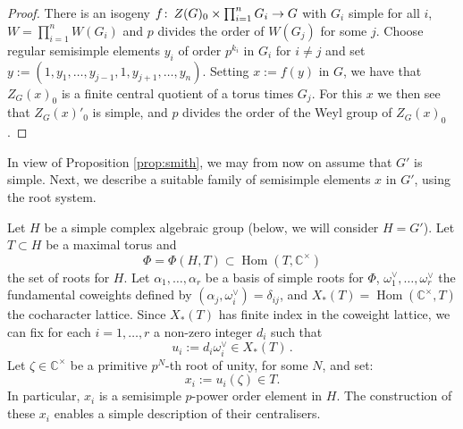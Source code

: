 \documentclass[oneside, 12pt, a4paper]{amsart}
\numberwithin{equation}{section}
\newcommand{\C}{\mathbb{C}}
\newcommand{\Hom}{\operatorname{Hom}}
\newcommand{\co}{\colon\thinspace}
\theoremstyle{plain}
\theoremstyle{definition}
\theoremstyle{remark}
\begin{document}
\begin{proof}
There is an isogeny $f\co Z(G)_0\times \prod_{i=1}^n G_i\to G$ with $G_i$ simple for all $i$, $W=\prod_{i=1}^n W(G_i)$ and $p$ divides the order of $W(G_j)$ for some $j$. Choose regular semisimple elements $y_i$ of order $p^{k_i}$ in $G_i$ for $i\neq j$ and set $y:=(1,y_1,\dots,y_{j-1},1,y_{j+1},\dots,y_n)$. Setting $x:=f(y)$ in $G$, we have that $Z_G(x)_0$ is a finite central quotient of a torus times $G_j$. For this $x$ we then see that $Z_G(x)'_0$ is simple, and $p$ divides the order of the Weyl group of $Z_G(x)_0$.
\end{proof}

In view of Proposition \ref{prop:smith}, we may from now on assume that $G'$ is simple. Next, we describe a suitable family of semisimple elements $x$ in $G'$, using the root system.

Let $H$ be a simple complex algebraic group (below, we will consider $H=G'$). Let $T\subset H$ be a maximal torus and
\[
\Phi=\Phi(H,T)\subset \Hom(T,\C^\times)
\]
the set of roots for $H$. Let $\alpha_1,\dots,\alpha_r$ be a basis of simple roots for $\Phi$, $\omega_1^\vee,\dots,\omega_r^\vee$ the fundamental coweights defined by $(\alpha_j,\omega_i^\vee)=\delta_{ij}$, and $X_\ast(T)=\Hom(\C^\times,T)$ the cocharacter lattice. Since $X_\ast(T)$ has finite index in the coweight lattice, we can fix for each $i=1,\dots,r$ a non-zero integer $d_i$ such that
\[
u_i:=d_i \omega_i^\vee\in X_\ast(T)\,.
\]
Let $\zeta\in \C^\times$ be a primitive $p^N$-th root of unity, for some $N$, and set: \[x_i:=u_i(\zeta)\in T.\]
In particular, $x_i$ is a semisimple $p$-power order element in $H$. The construction of these $x_i$ enables a simple description of their centralisers.
\end{document}
